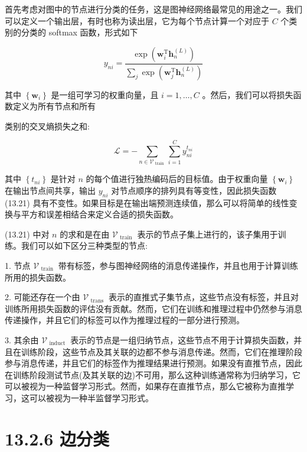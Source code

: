 \documentclass[10pt]{article}
\begin{document}
首先考虑对图中的节点进行分类的任务，这是图神经网络最常见的用途之一。我们可以定义一个输出层，有时也称为读出层，它为每个节点计算一个对应于 \(C\) 个类别的分类的 softmax 函数，形式如下

\[
{y}_{ni} = \frac{\exp \left( {{\mathbf{w}}_{i}^{\mathrm{T}}{\mathbf{h}}_{n}^{\left( L\right) }}\right) }{\mathop{\sum }\limits_{j}\exp \left( {{\mathbf{w}}_{j}^{\mathrm{T}}{\mathbf{h}}_{n}^{\left( L\right) }}\right) } \tag{13.20}
\]

其中 \(\left\{  {\mathbf{w}}_{i}\right\}\) 是一组可学习的权重向量，且 \(i = 1,\ldots ,C\) 。然后，我们可以将损失函数定义为所有节点和所有

类别的交叉熵损失之和:

\[
\mathcal{L} =  - \mathop{\sum }\limits_{{n \in  {\mathcal{V}}_{\text{ train }}}}\mathop{\sum }\limits_{{i = 1}}^{C}{y}_{ni}^{{t}_{ni}} \tag{13.21}
\]

其中 \(\left\{  {t}_{ni}\right\}\) 是针对 \(n\) 的每个值进行独热编码后的目标值。由于权重向量 \(\left\{  {\mathbf{w}}_{i}\right\}\) 在输出节点间共享，输出 \({y}_{ni}\) 对节点顺序的排列具有等变性，因此损失函数 (13.21) 具有不变性。如果目标是在输出端预测连续值，那么可以将简单的线性变换与平方和误差相结合来定义合适的损失函数。

(13.21) 中对 \(n\) 的求和是在由 \({\mathcal{V}}_{\text{ train }}\) 表示的节点子集上进行的，该子集用于训练。我们可以如下区分三种类型的节点:

1. 节点 \({\mathcal{V}}_{\text{ train }}\) 带有标签，参与图神经网络的消息传递操作，并且也用于计算训练所用的损失函数。

2. 可能还存在一个由 \({\mathcal{V}}_{\text{ trans }}\) 表示的直推式子集节点，这些节点没有标签，并且对训练所用损失函数的评估没有贡献。然而，它们在训练和推理过程中仍然参与消息传递操作，并且它们的标签可以作为推理过程的一部分进行预测。

3. 其余由 \({\mathcal{V}}_{\text{ induct }}\) 表示的节点是一组归纳节点，这些节点不用于计算损失函数，并且在训练阶段，这些节点及其关联的边都不参与消息传递。然而，它们在推理阶段参与消息传递，并且它们的标签作为推理结果进行预测。如果没有直推节点，因此在训练阶段测试节点(及其关联的边)不可用，那么这种训练通常称为归纳学习，它可以被视为一种监督学习形式。然而，如果存在直推节点，那么它被称为直推学习，这可以被视为一种半监督学习形式。

\section*{13.2.6 边分类}
\end{document}
